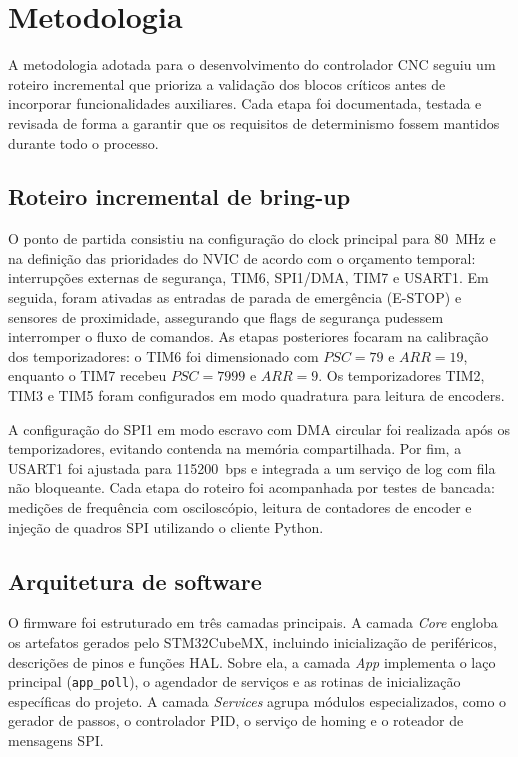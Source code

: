 \chapter{Metodologia}\label{cap:metodologia}

A metodologia adotada para o desenvolvimento do controlador CNC seguiu
um roteiro incremental que prioriza a validação dos blocos críticos antes
de incorporar funcionalidades auxiliares. Cada etapa foi documentada,
testada e revisada de forma a garantir que os requisitos de determinismo
fossem mantidos durante todo o processo.

\section{Roteiro incremental de bring-up}

O ponto de partida consistiu na configuração do clock principal para
\SI{80}{\mega\hertz} e na definição das prioridades do NVIC de acordo
com o orçamento temporal: interrupções externas de segurança, TIM6,
SPI1/DMA, TIM7 e USART1. Em seguida, foram ativadas as entradas de parada
de emergência (E-STOP) e sensores de proximidade, assegurando que flags
de segurança pudessem interromper o fluxo de comandos. As etapas
posteriores focaram na calibração dos temporizadores: o TIM6 foi
dimensionado com $PSC = 79$ e $ARR = 19$, enquanto o TIM7 recebeu
$PSC = 7999$ e $ARR = 9$. Os temporizadores TIM2, TIM3 e TIM5 foram
configurados em modo quadratura para leitura de encoders.

A configuração do SPI1 em modo escravo com DMA circular foi realizada
após os temporizadores, evitando contenda na memória compartilhada.
Por fim, a USART1 foi ajustada para \SI{115200}{bps} e integrada a um
serviço de log com fila não bloqueante. Cada etapa do roteiro foi
acompanhada por testes de bancada: medições de frequência com
osciloscópio, leitura de contadores de encoder e injeção de quadros SPI
utilizando o cliente Python.

\section{Arquitetura de software}

O firmware foi estruturado em três camadas principais. A camada \emph{Core}
engloba os artefatos gerados pelo STM32CubeMX, incluindo inicialização de
periféricos, descrições de pinos e funções HAL. Sobre ela, a camada
\emph{App} implementa o laço principal (\texttt{app\_poll}), o agendador de
serviços e as rotinas de inicialização específicas do projeto. A camada
\emph{Services} agrupa módulos especializados, como o gerador de passos,
o controlador PID, o serviço de homing e o roteador de mensagens SPI.

